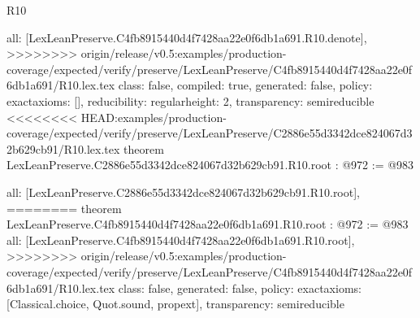 \begin{lexlean}{R10}
\begin{coremodule}
{{{{{  all: [LexLeanPreserve.C4fb8915440d4f7428aa22e0f6db1a691.R10.denote],
>>>>>>>> origin/release/v0.5:examples/production-coverage/expected/verify/preserve/LexLeanPreserve/C4fb8915440d4f7428aa22e0f6db1a691/R10.lex.tex
  class: false,
  compiled: true,
  generated: false,
  policy: exact{axioms: []},
  reducibility: regular{height: 2},
  transparency: semireducible
}
<<<<<<<< HEAD:examples/production-coverage/expected/verify/preserve/LexLeanPreserve/C2886e55d3342dce824067d32b629cb91/R10.lex.tex
theorem LexLeanPreserve.C2886e55d3342dce824067d32b629cb91.R10.root : @972 := @983 {
  all: [LexLeanPreserve.C2886e55d3342dce824067d32b629cb91.R10.root],
========
theorem LexLeanPreserve.C4fb8915440d4f7428aa22e0f6db1a691.R10.root : @972 := @983 {
  all: [LexLeanPreserve.C4fb8915440d4f7428aa22e0f6db1a691.R10.root],
>>>>>>>> origin/release/v0.5:examples/production-coverage/expected/verify/preserve/LexLeanPreserve/C4fb8915440d4f7428aa22e0f6db1a691/R10.lex.tex
  class: false,
  generated: false,
  policy: exact{axioms: [Classical.choice, Quot.sound, propext]},
  transparency: semireducible
}

}}}}}
\end{coremodule}
\end{lexlean}
